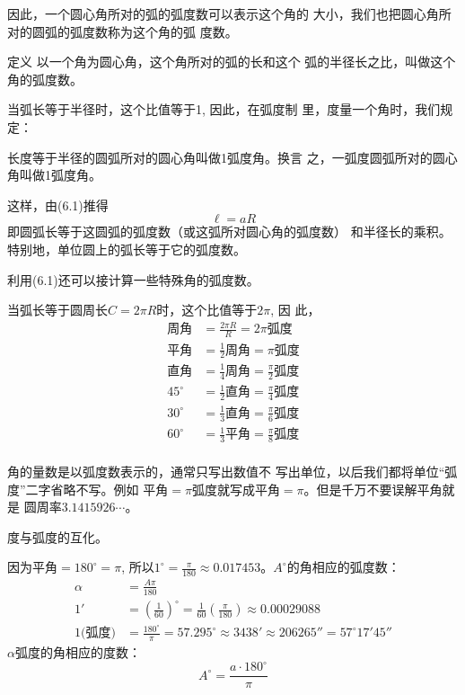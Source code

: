 因此，一个圆心角所对的弧的弧度数可以表示这个角的
大小，我们也把圆心角所对的圆弧的弧度数称为这个角的弧
度数。

\begin{blk}{定义}
    以一个角为圆心角，这个角所对的弧的长和这个
弧的半径长之比，叫做这个角的弧度数。
\end{blk}

当弧长等于半径时，这个比值等于1, 因此，在弧度制
里，度量一个角时，我们规定：

长度等于半径的圆弧所对的圆心角叫做1弧度角。换言
之，一弧度圆弧所对的圆心角叫做1弧度角。

这样，由(6.1)推得
\begin{equation}
    \ell=aR
\end{equation}
即圆弧长等于这圆弧的弧度数（或这弧所对圆心角的弧度数）
和半径长的乘积。特别地，单位圆上的弧长等于它的弧度数。

利用(6.1)还可以接计算一些特殊角的弧度数。

当弧长等于圆周长$C=2\pi R$时，这个比值等于$2\pi$, 因
此，
\[\begin{split}
    \text{周角}&=  \frac{2\pi R}{R}=2\pi \text{弧度}\\
    \text{平角}&=\frac{1}{2} \text{周角}=\pi \text{弧度}\\
    \text{直角}&=\frac{1}{4}\text{周角}=\frac{\pi}{2}\text{弧度}\\
    45^{\circ}&=\frac{1}{2}\text{直角}=\frac{\pi}{4}\text{弧度}\\
    30^{\circ}&=\frac{1}{3}\text{直角}=\frac{\pi}{6}\text{弧度}\\
    60^{\circ}&=\frac{1}{3}\text{平角}=\frac{\pi}{8}\text{弧度}\\
\end{split}\]

\begin{rmk}
角的量数是以弧度数表示的，通常只写出数值不
写出单位，以后我们都将单位“弧度”二字省略不写。例如
平角$=\pi$弧度就写成平角$=\pi$。但是千万不要误解平角就是
圆周率$3.1415926\cdots$。
\end{rmk}

度与弧度的互化。

因为平角$=180^{\circ}=\pi$, 所以$1^{\circ}=\frac{\pi}{180}
\approx 0.017453$。$A^{\circ}$的角相应的弧度数：
\[\begin{split}
    \alpha&=\frac{A\pi}{180}\\
    1'&=\left(\frac{1}{60}\right)^{\circ}=\frac{1}{60}\left(\frac{\pi}{180}\right)\approx 0.00029088\\
    1\text{(弧度)}&=\frac{180^{\circ}}{\pi}=57.295^{\circ}\approx 3438'\approx 206265''
    = 57^{\circ}17'45''
\end{split}\]
$\alpha$弧度的角相应的度数：
\[A^{\circ}=\frac{a\cdot 180^{\circ}}{\pi}\]

